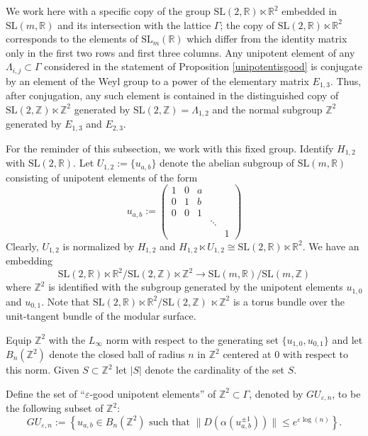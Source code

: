\documentclass[10pt,reqno]{amsart}
\theoremstyle{Theorem}
\theoremstyle{definition}
\theoremstyle{remark}
\newcommand{\note}[1]{\marginpar{{\color{red}\footnotesize \begin{spacing}{1}#1\end{spacing}}}}
\renewcommand{\epsilon}{\varepsilon}
\newcommand{\R}{\mathbb {R}}
\newcommand{\Z}{\mathbb {Z}}
\newcommand{\e}{\epsilon}
\newcommand{\Sl}{\mathrm{SL}}
\def\SL{\Sl}
\begin{document}
We work here with a specific copy of the group $\Sl(2,\R)\ltimes\R^2$ embedded in $\Sl(m,\R)$ and its intersection with the lattice $\Gamma$; the copy of $\Sl(2,\R)\ltimes\R^2$ corresponds to the elements of $\SL_m(\R)$ which differ from the identity matrix only in  the first two rows and  first three columns.
Any   unipotent element of   any $\Lambda_{i,j}\subset \Gamma$ considered in   the statement of Proposition \ref{unipotentisgood} is conjugate by an element of the  Weyl group to a power of the elementary matrix $E_{1,3}$.  Thus, after conjugation, any such element is contained in the  distinguished     copy of  $\Sl(2,\Z) \ltimes \Z^2$ generated by  $\Sl(2,\Z) = \Lambda_{1,2}$ and the normal subgroup $\Z^2$   generated by $E_{1,3}$ and $E_{2,3}$.

 For the reminder of this subsection, we   work with this fixed group. Identify $H_{1,2}$ with $\Sl(2,\R)$. Let $U_{1,2}:=  \{ u_{a,b}\}$ denote the abelian subgroup of $\Sl(m,\R)$ consisting of unipotent elements of the form %
$$
u_{a,b}:= \left(\begin{array}{ccccc}1  &  0  & a  &  &   \\   0 & 1  &   b  & &   \\   0 & 0 & 1 &   &   \\  &   &   &  \ddots &  \\  &   &   &   &1  \end{array}\right)$$
Clearly, $U_{1,2}$ is normalized by $H_{1,2}$ and  $H_{1,2} \ltimes U_{1,2}  \cong \Sl(2,\R) \ltimes \R^2$.    We have an embedding $$ \Sl(2,\R) \ltimes \R^2 / \Sl(2,\Z)\ltimes \Z^2 \to \Sl(m,\R)/\Sl(m,\Z)$$ where $\Z^2$ is identified with the subgroup generated by the unipotent elements $u_{1,0}$ and $u_{0,1}$. Note that $\Sl(2,\R) \ltimes \R^2 / \Sl(2,\Z)\ \ltimes \Z^2$ is a torus bundle over the unit-tangent bundle of the modular surface.

Equip $\Z^2$ with the $L_\infty$ norm with respect to the generating set $\{u_{1,0}, u_{0,1}\}$ and let $B_n(\Z^2)$ denote the closed ball of radius $n$ in $\Z^2$ centered at $0$ with respect to this norm.  Given $S\subset \Z^2$ let   $|S|$ denote the cardinality of the set  $S$.

Define the set of ``$\epsilon$-good unipotent  elements'' of $\Z^2\subset \Gamma$, denoted  by $GU_{\e,n}$, to be the following subset of $\Z^2$:
\begin{equation}\label{eq:racistPOTUS} GU_{\e,n} := \left\{ u_{a,b} \in B_n (\Z^2) \text{ such that } \|D(\alpha(u_{a,b}^{\pm1}))\| \leq e^{\e \log(n)}\right\}.\end{equation}
\end{document}
